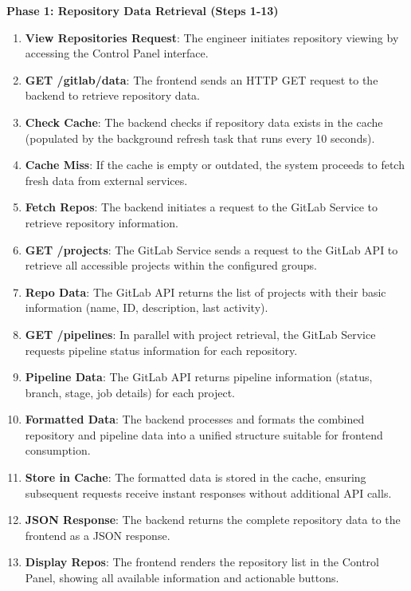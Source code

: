 \textbf{Phase 1: Repository Data Retrieval (Steps 1-13)}

\begin{enumerate}
    \item \textbf{View Repositories Request}: The engineer initiates repository viewing by accessing the Control Panel interface.
    
    \item \textbf{GET /gitlab/data}: The frontend sends an HTTP GET request to the backend to retrieve repository data.
    
    \item \textbf{Check Cache}: The backend checks if repository data exists in the cache (populated by the background refresh task that runs every 10 seconds).
    
    \item \textbf{Cache Miss}: If the cache is empty or outdated, the system proceeds to fetch fresh data from external services.
    
    \item \textbf{Fetch Repos}: The backend initiates a request to the GitLab Service to retrieve repository information.
    
    \item \textbf{GET /projects}: The GitLab Service sends a request to the GitLab API to retrieve all accessible projects within the configured groups.
    
    \item \textbf{Repo Data}: The GitLab API returns the list of projects with their basic information (name, ID, description, last activity).
    
    \item \textbf{GET /pipelines}: In parallel with project retrieval, the GitLab Service requests pipeline status information for each repository.
    
    \item \textbf{Pipeline Data}: The GitLab API returns pipeline information (status, branch, stage, job details) for each project.
    
    \item \textbf{Formatted Data}: The backend processes and formats the combined repository and pipeline data into a unified structure suitable for frontend consumption.
    
    \item \textbf{Store in Cache}: The formatted data is stored in the cache, ensuring subsequent requests receive instant responses without additional API calls.
    
    \item \textbf{JSON Response}: The backend returns the complete repository data to the frontend as a JSON response.
    
    \item \textbf{Display Repos}: The frontend renders the repository list in the Control Panel, showing all available information and actionable buttons.
\end{enumerate}

